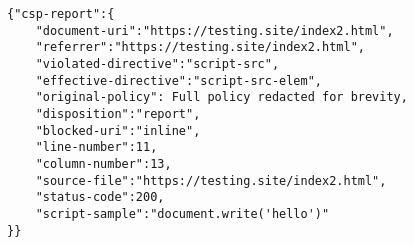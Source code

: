\begin{verbatim}
{"csp-report":{
	"document-uri":"https://testing.site/index2.html",
	"referrer":"https://testing.site/index2.html",
	"violated-directive":"script-src",
	"effective-directive":"script-src-elem",
	"original-policy": Full policy redacted for brevity,
	"disposition":"report",
	"blocked-uri":"inline",
	"line-number":11,
	"column-number":13,
	"source-file":"https://testing.site/index2.html",
	"status-code":200,
	"script-sample":"document.write('hello')"
}}
\end{verbatim}
